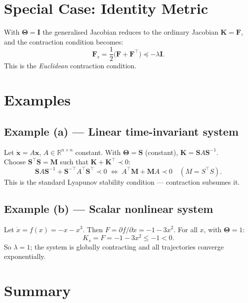\documentclass[11pt,a4paper]{article}
\begin{document}
\section{Special Case: Identity Metric}

With $\bm{\Theta} = \bm{I}$ the generalised Jacobian reduces to the ordinary
Jacobian $\bm{K} = \bm{F}$, and the contraction condition becomes:
\begin{equation}
  \bm{F}_s = \frac{1}{2}\bigl(\bm{F} + \bm{F}^\top\bigr) \preceq -\lambda\bm{I}.
  \label{eq:euclidean}
\end{equation}
This is the \emph{Euclidean} contraction condition.

\section{Examples}

\subsection*{Example (a) --- Linear time-invariant system}

Let $\dot{\bm{x}} = A\bm{x}$, $A\in\mathbb{R}^{n\times n}$ constant.
With $\bm{\Theta} = \bm{S}$ (constant), $\bm{K} = \bm{S}A\bm{S}^{-1}$.\\
Choose $\bm{S}^\top\bm{S} = \bm{M}$ such that $\bm{K}+\bm{K}^\top \prec 0$:
\[
  \bm{S}A\bm{S}^{-1} + \bm{S}^{-\top}A^\top\bm{S}^\top \prec 0
  \;\Longleftrightarrow\;
  A^\top\bm{M} + \bm{M}A \prec 0 \quad (M = S^\top S).
\]
This is the standard Lyapunov stability condition — contraction subsumes it.

\subsection*{Example (b) --- Scalar nonlinear system}

Let $\dot x = f(x) = -x - x^3$.  Then $F = \partial f/\partial x = -1 - 3x^2$.
For all $x$, with $\bm{\Theta}=1$:
\[
  K_s = F = -1 - 3x^2 \leq -1 < 0.
\]
So $\lambda = 1$; the system is globally contracting and all trajectories
converge exponentially.

\section{Summary}
\end{document}
